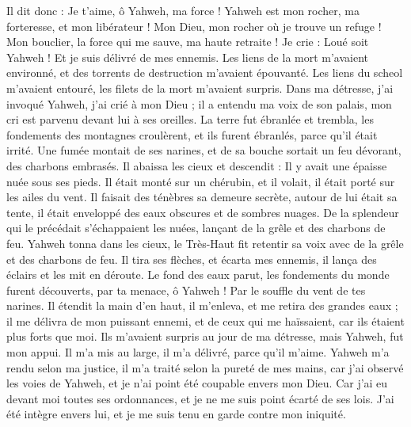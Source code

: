 \begin{multicols}{2}
Il dit donc : Je t'aime, ô Yahweh, ma force !
Yahweh est mon rocher, ma forteresse, et mon libérateur ! Mon Dieu, mon rocher où je trouve un refuge ! Mon bouclier, la force qui me sauve, ma haute retraite !
Je crie : Loué soit Yahweh ! Et je suis délivré de mes ennemis.
Les liens de la mort m'avaient environné, et des torrents de destruction m'avaient épouvanté.
Les liens du scheol m'avaient entouré, les filets de la mort m'avaient surpris.
Dans ma détresse, j'ai invoqué Yahweh, j'ai crié à mon Dieu ; il a entendu ma voix de son palais, mon cri est parvenu devant lui à ses oreilles.
La terre fut ébranlée et trembla, les fondements des montagnes croulèrent, et ils furent ébranlés, parce qu'il était irrité.
Une fumée montait de ses narines, et de sa bouche sortait un feu dévorant, des charbons embrasés.
Il abaissa les cieux et descendit : Il y avait une épaisse nuée sous ses pieds.
Il était monté sur un chérubin, et il volait, il était porté sur les ailes du vent.
Il faisait des ténèbres sa demeure secrète, autour de lui était sa tente, il était enveloppé des eaux obscures et de sombres nuages.
De la splendeur qui le précédait s'échappaient les nuées, lançant de la grêle et des charbons de feu.
Yahweh tonna dans les cieux, le Très-Haut fit retentir sa voix avec de la grêle et des charbons de feu.
Il tira ses flèches, et écarta mes ennemis, il lança des éclairs et les mit en déroute.
Le fond des eaux parut, les fondements du monde furent découverts, par ta menace, ô Yahweh ! Par le souffle du vent de tes narines.
Il étendit la main d'en haut, il m'enleva, et me retira des grandes eaux ;
il me délivra de mon puissant ennemi, et de ceux qui me haïssaient, car ils étaient plus forts que moi.
Ils m'avaient surpris au jour de ma détresse, mais Yahweh, fut mon appui.
Il m'a mis au large, il m'a délivré, parce qu'il m'aime.
Yahweh m'a rendu selon ma justice, il m'a traité selon la pureté de mes mains,
car j'ai observé les voies de Yahweh, et je n'ai point été coupable envers mon Dieu.
Car j'ai eu devant moi toutes ses ordonnances, et je ne me suis point écarté de ses lois.
J'ai été intègre envers lui, et je me suis tenu en garde contre mon iniquité.

\end{multicols}
